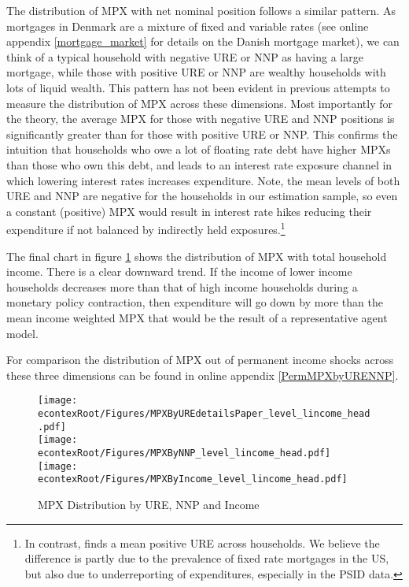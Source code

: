 \documentclass[titlepage]{\econtex}\newcommand{\texname}{ConsumptionHeterogeneity}
\begin{document}
The distribution of MPX with net nominal position follows a similar pattern. As mortgages in Denmark are a mixture of fixed and variable rates (see online appendix \ref{mortgage_market} for details on the Danish mortgage market), we can think of a typical household with negative URE or NNP as having a large mortgage, while those with positive URE or NNP are wealthy households with lots of liquid wealth. This pattern has not been evident in previous attempts to measure the distribution of MPX across these dimensions. Most importantly for the theory, the average MPX for those with negative URE and NNP positions is significantly greater than for those with positive URE or NNP. This confirms the intuition that households who owe a lot of floating rate debt have higher MPXs than those who own this debt, and leads to an interest rate exposure channel in which lowering interest rates increases expenditure. Note, the mean levels of both URE and NNP are negative for the households in our estimation sample, so even a constant (positive) MPX would result in interest rate hikes reducing their expenditure if not balanced by indirectly held exposures.\footnote{In contrast, \cite{auclert_monetary_2017} finds a mean positive URE across households. We believe the difference is partly due to the prevalence of fixed rate mortgages in the US, but also due to underreporting of expenditures, especially in the PSID data.}

The final chart in figure \ref{fig:MPCAuclert} shows the distribution of MPX with total household income. There is a clear downward trend. If the income of lower income households decreases more than that of high income households during a monetary policy contraction, then expenditure will go down by more than the mean income weighted MPX that would be the result of a representative agent model.

For comparison the distribution of  MPX out of permanent income shocks across these three dimensions can be found in online appendix \ref{PermMPXbyURENNP}.
\begin{figure} 
\begin{centering}
	\texttt{[image: \\econtexRoot/Figures/MPXByUREdetailsPaper\_level\_lincome\_head.pdf]} \\
	\texttt{[image: \\econtexRoot/Figures/MPXByNNP\_level\_lincome\_head.pdf]}
	\texttt{[image: \\econtexRoot/Figures/MPXByIncome\_level\_lincome\_head.pdf]}
	\caption{MPX Distribution by URE, NNP and Income}
	\label{fig:MPCAuclert}
\end{centering}
\end{figure}
\end{document}
